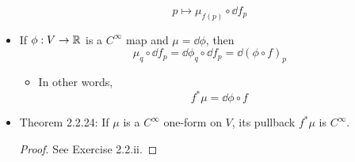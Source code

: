 \documentclass[../notes.tex]{subfiles}
\begin{document}
\begin{itemize}
    \begin{equation*}
        p \mapsto \mu_{f(p)}\circ\dd{f_p}
    \end{equation*}
    \item If $\phi:V\to\mathbb{R}$ is a $C^\infty$ map and $\mu=\dd{\phi}$, then
    \begin{equation*}
        \mu_q\circ\dd f_p = \dd\phi_q\circ\dd f_p
        = \dd(\phi\circ f)_p
    \end{equation*}
    \begin{itemize}
        \item In other words,
        \begin{equation*}
            f^*\mu = \dd\phi\circ f
        \end{equation*}
    \end{itemize}
    \item Theorem 2.2.24: If $\mu$ is a $C^\infty$ one-form on $V$, its pullback $f^*\mu$ is $C^\infty$.
    \begin{proof}
        See Exercise 2.2.ii.
    \end{proof}
\end{itemize}
\end{document}
